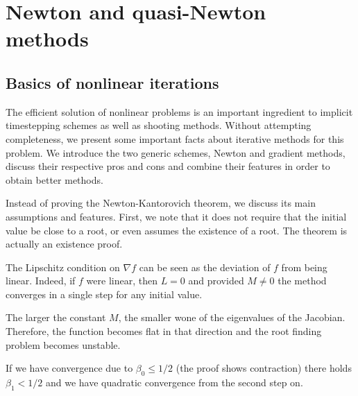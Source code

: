 \chapter{Newton and quasi-Newton methods}
\label{chapter:Newton}

\section{Basics of nonlinear iterations}
\begin{intro}
  The efficient solution of nonlinear problems is an important
  ingredient to implicit timestepping schemes as well as shooting
  methods. Without attempting completeness, we present some important
  facts about iterative methods for this problem. We introduce the two
  generic schemes, Newton and gradient methods, discuss their
  respective pros and cons and combine their features in order to
  obtain better methods.
\end{intro}






\begin{remark}
  Instead of proving the Newton-Kantorovich theorem, we discuss its
  main assumptions and features. First, we note that it does not
  require that the initial value be close to a root, or even assumes
  the existence of a root. The theorem is actually an existence proof.
  
  The Lipschitz condition on $\nabla f$ can be seen as the deviation
  of $f$ from being linear. Indeed, if $f$ were linear, then $L=0$ and
  provided $M\neq 0$ the method converges in a single step for any
  initial value.

  The larger the constant $M$, the smaller wone of the eigenvalues of
  the Jacobian. Therefore, the function becomes flat in that
  direction and the root finding problem becomes unstable.
  
  If we have convergence due to $\beta_0 \le 1/2$ (the proof shows
  contraction) there holds $\beta_1 < 1/2$ and we have quadratic
  convergence from the second step on.
\end{remark}





